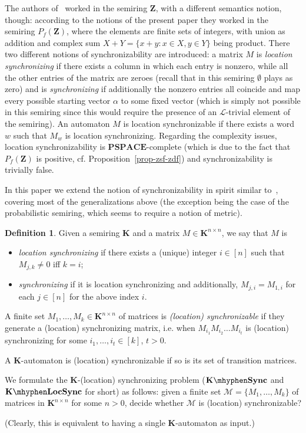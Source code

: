 \documentclass[submission,copyright,creativecommons]{eptcs}
\def\bK{{\mathbf{K}}}
\def\bZ{{\mathbf{Z}}}
\theoremstyle{plain}
\theoremstyle{definition}
\newtheorem{definition}{Definition}{}
\theoremstyle{remark}
\begin{document}
The authors of~\cite{larsen} worked in the semiring $\bZ$, with a different semantics notion, though:
according to the notions of the present paper they worked in the semiring $P_f(\bZ)$, where the elements are finite sets of integers,
with union as addition and complex sum $X+Y=\{x+y:x\in X,y\in Y\}$ being product.
There two different notions of synchronizability are introduced: a matrix $M$ is \emph{location synchronizing} if there exists
a column in which each entry is nonzero, while all the other entries of the matrix are zeroes (recall that in this semiring
$\emptyset$ plays as zero)
and is \emph{synchronizing} if additionally the nonzero entries all coincide and map every possible starting vector $\alpha$
to some fixed vector (which is simply not possible in this semiring since this would require the presence of an $\mathcal{L}$-trivial element of the semiring).
An automaton $M$ is location synchronizable if there exists a word $w$ such that
$M_w$ is location synchronizing.
Regarding the complexity issues, location synchronizability is $\mathbf{PSPACE}$-complete (which is due to the fact
that $P_f(\bZ)$ is positive, cf. Proposition~\ref{prop-zsf-zdf})
and synchronizability is trivially false.

In this paper we extend the notion of synchronizability in spirit similar to~\cite{larsen}, covering most of the generalizations above
(the exception being the case of the probabilistic semiring, which seems to require a notion of metric).
\begin{definition}
Given a semiring $\bK$ and a matrix $M\in\bK^{n\times n}$, we say that $M$ is
\begin{itemize}
\item \emph{location synchronizing} if there exists a (unique) integer $i\in[n]$ such that $M_{j,k}\neq 0$ iff $k=i$;
\item \emph{synchronizing} if it is location synchronizing and additionally, $M_{j,i}=M_{1,i}$ for each $j\in[n]$ for the above index $i$.
\end{itemize}
A finite set $M_1,\ldots,M_k\in\bK^{n\times n}$ of matrices is \emph{(location) synchronizable} if they generate a (location) synchronizing matrix,
i.e. when $M_{i_1}M_{i_2}\ldots M_{i_t}$ is (location) synchronizing for some $i_1,\ldots,i_t\in[k]$, $t>0$.

A $\bK$-automaton is (location) synchronizable if so is its set of transition matrices.

We formulate the $\bK$-(location) synchronizing problem
($\bK\mhyphen\mathbf{Sync}$ and $\bK\mhyphen\mathbf{LocSync}$ for short)
as follows: given a finite set $\mathcal{M}=\{M_1,\ldots,M_k\}$ of matrices
in $\bK^{n\times n}$ for some $n>0$, decide whether $\mathcal{M}$ is (location) synchronizable?

(Clearly, this is equivalent to having a single $\bK$-automaton as input.)
\end{definition}
\end{document}
